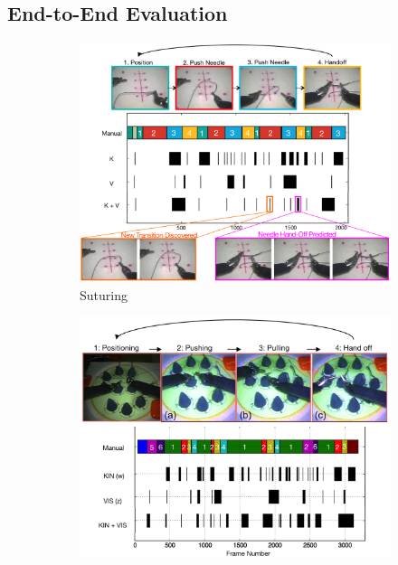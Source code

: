 \subsection{End-to-End Evaluation}

\begin{figure}[!ht]
	\centering
	\begin{subfigure}[t]{7in}
	    \centering
        \includegraphics[width=0.8\linewidth]{figures/suturing}
		\caption{Suturing}
		\label{fig:suturing}
	\end{subfigure}
	\begin{subfigure}[t]{0.5\textwidth}
	    \vspace{0pt}
	    \centering
		\includegraphics[width=\linewidth]{figures/needle_passing}

\end{subfigure}
\end{figure}
